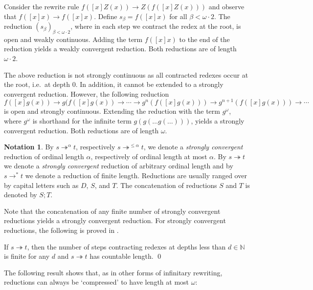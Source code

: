 \documentclass{LMCS}
\theoremstyle{plain}
\theoremstyle{definition}
\newtheorem{notation}[thm]{Notation}
\newcommand{\rew}{\rightarrow}
\newcommand{\rewt}{\rightarrow^*}
\newcommand{\trewt}{\twoheadrightarrow}
\newcommand{\trewtp}[1]{\twoheadrightarrow^{#1}}
\newcommand{\natnum}{\mathbb{N}}
\begin{document}
\begin{exa}
\label{ex:wconv}
Consider the rewrite rule $f([x]Z(x)) \rew Z(f([x]Z(x)))$ and observe that $f([x]x) \rew f([x]x)$. Define $s_\beta = f([x]x)$ for all $\beta < \omega \cdot 2$. The reduction $(s_\beta)_{\beta < \omega \cdot 2}$, where in each step we contract the redex at the root, is open and weakly continuous. Adding the term $f([x]x)$ to the end of the reduction yields a weakly convergent reduction. Both reductions are of length $\omega \cdot 2$.

The above reduction is not strongly continuous as all contracted redexes occur at the root, i.e.\ at depth $0$. 
In addition, it cannot be extended to a strongly convergent reduction.
However,
the following reduction
\[
f([x]g(x)) \rew g(f([x]g(x)) \rew \cdots \rew g^n(f([x]g(x))) \rew g^{n + 1}(f([x]g(x))) \rew \cdots
\]
is open and strongly continuous. Extending the reduction with the term $g^\omega$, where $g^\omega$ is shorthand for the infinite term $g(g(\ldots g(\ldots)))$, yields a strongly convergent reduction. Both reductions are of length $\omega$.
\end{exa}





\begin{notation}
By $s \trewtp{\alpha} t$, respectively $s \trewtp{\leq \alpha} t$, we
denote a \emph{strongly convergent} reduction of ordinal
length $\alpha$, respectively of ordinal length at most
$\alpha$. By $s \trewt t$ we denote a \emph{strongly convergent}
reduction of arbitrary ordinal length and by $s \rewt t$
we denote a reduction of finite length.
Reductions are usually ranged over by
capital letters such as $D$, $S$, and $T$.
The concatenation of reductions $S$ and $T$ 
is denoted by $S ; T$.
\end{notation}

Note that the concatenation of any finite number of strongly convergent reductions yields a strongly convergent reduction. For strongly convergent reductions, the following is proved in \cite{JJ05a}.
\begin{lem}
\label{depthlem}
If $s \trewt t$, then the number of steps contracting redexes at depths less than $d \in \natnum$ is finite for any $d$ and $s \trewt t$ has countable length. \qed
\end{lem}

The following result \cite{JJ05a} shows that, as in other forms of infinitary rewriting, reductions can always be `compressed' to have length at most $\omega$:
\end{document}
